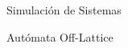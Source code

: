 \documentclass{article}
\begin{document}
    Simulación de Sistemas 
    
    Autómata Off-Lattice
\end{document}
